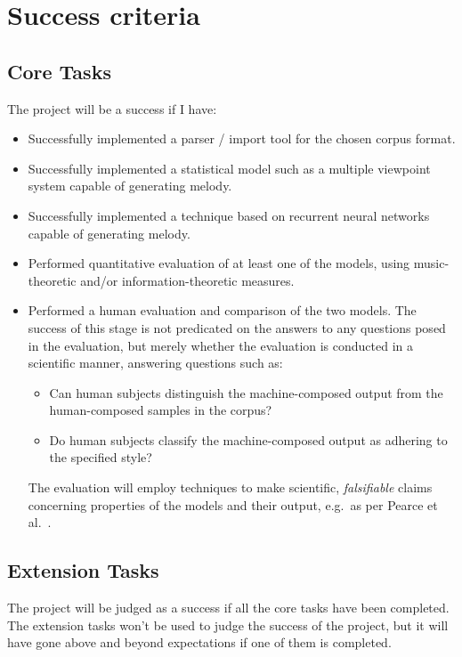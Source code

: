 \documentclass[12pt,a4paper,twoside]{article}
\begin{document}
\section{Success criteria}

\subsection{Core Tasks}

The project will be a success if I have:
\begin{itemize}
  \item Successfully implemented a parser / import tool for the chosen corpus
    format.
	\item Successfully implemented a statistical model such as a multiple
		viewpoint system capable of generating melody.
	\item Successfully implemented a technique based on recurrent neural
		networks capable of generating melody.
  \item Performed quantitative evaluation of at least one of the models, using
    music-theoretic and/or information-theoretic measures.
  \item Performed a human evaluation and comparison of the two models. The
    success of this stage is not predicated on the answers to any questions
    posed in the evaluation, but merely whether the evaluation is conducted in a
    scientific manner, answering questions such as:
	\begin{itemize}
		\item Can human subjects distinguish the machine-composed output
			from the human-composed samples in the corpus?
		\item Do human subjects classify the machine-composed output as
			adhering to the specified style?
	\end{itemize}
  
  The evaluation will employ techniques to make scientific, \emph{falsifiable}
  claims concerning properties of the models and their output, e.g.\ as per
  Pearce et al.\ 
  \cite{pearce2001evaluation}.

	\end{itemize}

\subsection{Extension Tasks}

The project will be judged as a success if all the core tasks have been
completed. The extension tasks won't be used to judge the success of the
project, but it will have gone above and beyond expectations if one of them is
completed.
\end{document}
